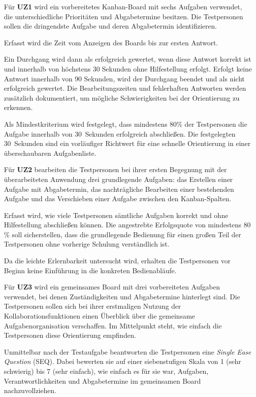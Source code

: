 \FloatBarrier

Für \textbf{UZ1} wird ein vorbereitetes Kanban-Board mit sechs Aufgaben verwendet, die unterschiedliche Prioritäten und Abgabetermine besitzen.
Die Testpersonen sollen die dringendste Aufgabe und deren Abgabetermin identifizieren.

Erfasst wird die Zeit vom Anzeigen des Boards bis zur ersten Antwort.

Ein Durchgang wird dann als erfolgreich gewertet, wenn diese Antwort korrekt ist und innerhalb von höchstens 30 Sekunden ohne Hilfestellung erfolgt.
Erfolgt keine Antwort innerhalb von 90 Sekunden, wird der Durchgang beendet und als nicht erfolgreich gewertet. Die Bearbeitungszeiten und fehlerhaften Antworten werden zusätzlich dokumentiert, um mögliche Schwierigkeiten bei der Orientierung zu erkennen.

Als Mindestkriterium wird festgelegt, dass mindestens 80\% der Testpersonen die Aufgabe innerhalb von 30~Sekunden erfolgreich abschließen.
Die festgelegten 30~Sekunden sind ein vorläufiger Richtwert für eine schnelle Orientierung in einer überschaubaren Aufgabenliste.

Für \textbf{UZ2} bearbeiten die Testpersonen bei ihrer ersten Begegnung mit der überarbeiteten Anwendung drei grundlegende Aufgaben: das Erstellen einer Aufgabe mit Abgabetermin, das nachträgliche Bearbeiten einer bestehenden Aufgabe und das Verschieben einer Aufgabe zwischen den Kanban-Spalten.

Erfasst wird, wie viele Testpersonen sämtliche Aufgaben korrekt und ohne Hilfestellung abschließen können.
Die angestrebte Erfolgsquote von mindestens 80\,\% soll sicherstellen, dass die grundlegende Bedienung für einen großen Teil der Testpersonen ohne vorherige Schulung verständlich ist.

Da die leichte Erlernbarkeit untersucht wird, erhalten die Testpersonen vor Beginn keine Einführung in die konkreten Bedienabläufe.

Für \textbf{UZ3} wird ein gemeinsames Board mit drei vorbereiteten Aufgaben verwendet, bei denen Zuständigkeiten und Abgabetermine hinterlegt sind. Die Testpersonen sollen sich bei ihrer erstmaligen Nutzung der Kollaborationsfunktionen einen Überblick über die gemeinsame Aufgabenorganisation verschaffen.
Im Mittelpunkt steht, wie einfach die Testpersonen diese Orientierung empfinden.

Unmittelbar nach der Testaufgabe beantworten die Testpersonen eine \textit{Single Ease Question} (SEQ).
Dabei bewerten sie auf einer siebenstufigen Skala von 1 (sehr schwierig) bis 7 (sehr einfach), wie einfach es für sie war, Aufgaben, Verantwortlichkeiten und Abgabetermine im gemeinsamen Board nachzuvollziehen.

